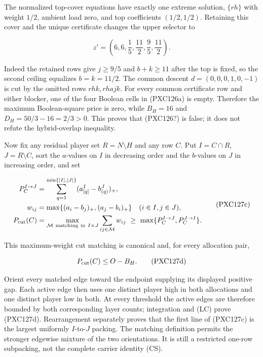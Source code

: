 \documentclass[11pt]{article}
\begin{document}
The normalized top-cover equations have exactly one extreme solution,
$\{rh\}$ with weight $1/2$, ambient load zero, and top coefficients
$(1/2,1/2)$.  Retaining this cover and the unique certificate changes the
upper selector to

\[
 z'=\left(6,6,\frac15,\frac{11}{2},\frac95,\frac{11}{2}\right).
\]

Indeed the retained rows give $j\ge9/5$ and $b+k\ge11$ after the top is
fixed, so the second ceiling equalizes $b=k=11/2$.  The common descent
$d=(0,0,0,1,0,-1)$ is cut by the omitted rows $rhk,rhajk$.  For every
common certificate row and either blocker, one of the four Boolean cells in
(PXC126a) is empty.  Therefore the maximum Boolean-square price is zero,
while $B_H=16$ and $D_H=50/3-16=2/3>0$.  This proves that (PXC126?) is
false; it does not refute the hybrid-overlap inequality.

Now fix any residual player set $R=N\setminus H$ and any row $C$.  Put
$I=C\cap R$, $J=R\setminus C$, sort the $a$-values on $I$ in
decreasing order and the $b$-values on $J$ in increasing order, and set

\begin{equation}
\begin{split}
 P_C^{I\to J}
   &=\sum_{q=1}^{\min\{|I|,|J|\}}(a^I_{[q]}-b^J_{(q)})_+,\\
 w_{ij}&=\max\{(a_i-b_j)_+,(a_j-b_i)_+\}\quad(i\in I,j\in J),\\
 P_{\rm cut}(C)
   &=\max_{\mathcal M\ {\rm matching\ in}\ I\times J}
       \sum_{ij\in\mathcal M}w_{ij}
     \ \ge\ \max\{P_C^{I\to J},P_C^{J\to I}\}.
\end{split}
                                                               \tag{PXC127c}
\end{equation}

This maximum-weight cut matching is canonical and, for every allocation pair,

\begin{equation}
                         P_{\rm cut}(C)\le O-B_H.     \tag{PXC127d}
\end{equation}

Orient every matched edge toward the endpoint supplying its displayed
positive gap.  Each active edge then uses one distinct player high in both
allocations and one distinct player low in both.  At every threshold the
active edges are therefore bounded by both corresponding layer counts;
integration and (LC) prove (PXC127d).  Rearrangement separately proves that
the first line of (PXC127c) is the largest uniformly $I$-to-$J$ packing.
The matching definition permits the stronger edgewise mixture of the two
orientations.  It is still a restricted one-row subpacking, not the complete
carrier identity (CS).
\end{document}
